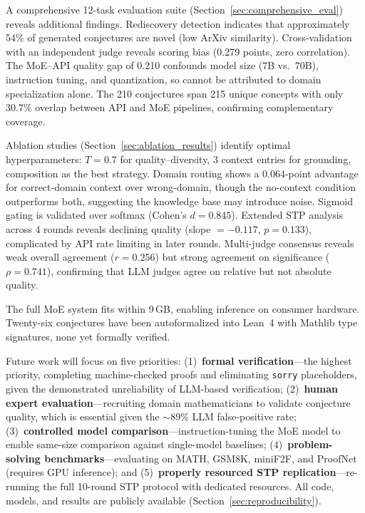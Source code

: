 \documentclass[11pt,a4paper]{article}
\begin{document}
A comprehensive 12-task evaluation suite (Section~\ref{sec:comprehensive_eval}) reveals additional findings. Rediscovery detection indicates that approximately 54\% of generated conjectures are novel (low ArXiv similarity). Cross-validation with an independent judge reveals scoring bias (0.279 points, zero correlation). The MoE--API quality gap of 0.210 confounds model size (7B vs.\ 70B), instruction tuning, and quantization, so cannot be attributed to domain specialization alone. The 210 conjectures span 215 unique concepts with only 30.7\% overlap between API and MoE pipelines, confirming complementary coverage.

Ablation studies (Section~\ref{sec:ablation_results}) identify optimal hyperparameters: $T{=}0.7$ for quality--diversity, 3 context entries for grounding, composition as the best strategy. Domain routing shows a 0.064-point advantage for correct-domain context over wrong-domain, though the no-context condition outperforms both, suggesting the knowledge base may introduce noise. Sigmoid gating is validated over softmax (Cohen's $d = 0.845$). Extended STP analysis across 4 rounds reveals declining quality (slope $= -0.117$, $p = 0.133$), complicated by API rate limiting in later rounds. Multi-judge consensus reveals weak overall agreement ($r = 0.256$) but strong agreement on significance ($\rho = 0.741$), confirming that LLM judges agree on relative but not absolute quality.

The full MoE system fits within 9\,GB, enabling inference on consumer hardware. Twenty-six conjectures have been autoformalized into Lean~4 with Mathlib type signatures, none yet formally verified.

Future work will focus on five priorities: (1)~\textbf{formal verification}---the highest priority, completing machine-checked proofs and eliminating \texttt{sorry} placeholders, given the demonstrated unreliability of LLM-based verification; (2)~\textbf{human expert evaluation}---recruiting domain mathematicians to validate conjecture quality, which is essential given the $\sim$89\% LLM false-positive rate; (3)~\textbf{controlled model comparison}---instruction-tuning the MoE model to enable same-size comparison against single-model baselines; (4)~\textbf{problem-solving benchmarks}---evaluating on MATH, GSM8K, miniF2F, and ProofNet (requires GPU inference); and (5)~\textbf{properly resourced STP replication}---re-running the full 10-round STP protocol with dedicated resources. All code, models, and results are publicly available (Section~\ref{sec:reproducibility}).
\end{document}
